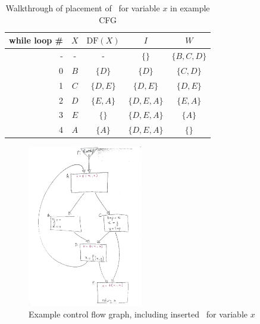 \begin{table}
\begin{center}
\begin{tabular}{r|c|c|c|c}
\textbf{while loop \#} & $X$ & $\textrm{DF}(X)$ & $I$         & $W$\\ \hline
-                      & -   & -                & $\{\}$      & $\{B,C,D\}$ \\
0                      & $B$ & $\{D\}$          & $\{D\}$     & $\{C,D\}$ \\
1                      & $C$ & $\{D,E\}$        & $\{D,E\}$   & $\{D,E\}$ \\
2                      & $D$ & $\{E,A\}$        & $\{D,E,A\}$ & $\{E,A\}$\\
3                      & $E$ & $\{\}$           & $\{D,E,A\}$ & $\{A\}$\\
4                      & $A$ & $\{A\}$          & $\{D,E,A\}$ & $\{\}$\\ \hline
\end{tabular}
\end{center}
\caption{\label{tab:classical_construction:walkthru}Walkthrough of
  placement of \phiops\ for variable $x$ in example CFG}
\end{table}

\begin{figure}
\includegraphics[width=5cm]{ssa_variablex.jpg}
\caption{\label{fig:classical_construction_algorithm:examplecfg_varx}Example control flow graph, including
inserted \phiops\ for variable $x$
}
\end{figure}

